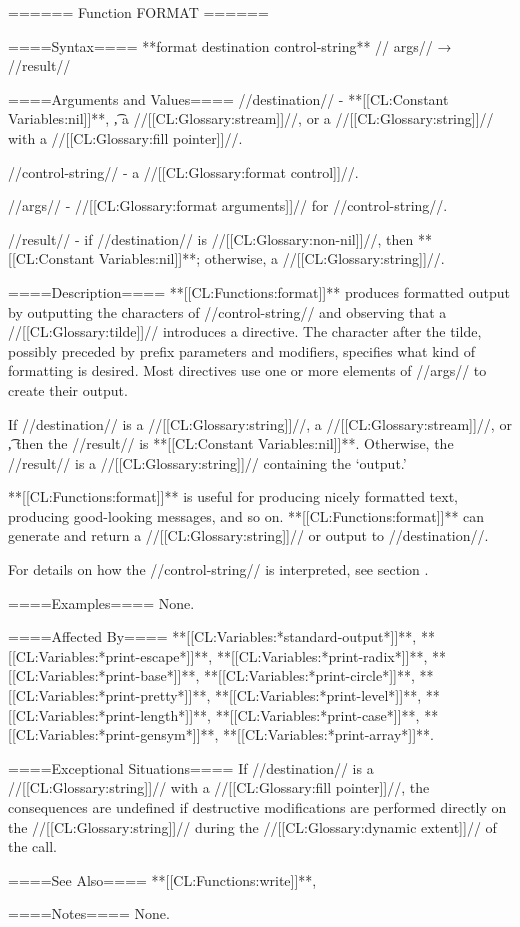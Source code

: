 ====== Function FORMAT ======

====Syntax====
**{format} {destination control-string** //\rest} args// → //result//

====Arguments and Values====
//destination// - **[[CL:Constant Variables:nil]]**, \t, a //[[CL:Glossary:stream]]//, or a //[[CL:Glossary:string]]// with a //[[CL:Glossary:fill pointer]]//.

//control-string// - a //[[CL:Glossary:format control]]//.

//args// - //[[CL:Glossary:format arguments]]// for //control-string//.

//result// - if //destination// is //[[CL:Glossary:non-nil]]//, then **[[CL:Constant Variables:nil]]**; otherwise, a //[[CL:Glossary:string]]//.

====Description====
**[[CL:Functions:format]]** produces formatted output by outputting the characters of //control-string// and observing that a //[[CL:Glossary:tilde]]// introduces a directive. The character after the tilde, possibly preceded by prefix parameters and modifiers, specifies what kind of formatting is desired. Most directives use one or more elements of //args// to create their output.

If //destination// is a //[[CL:Glossary:string]]//, a //[[CL:Glossary:stream]]//, or \t, then the //result// is **[[CL:Constant Variables:nil]]**. Otherwise, the //result// is a //[[CL:Glossary:string]]// containing the `output.'

**[[CL:Functions:format]]** is useful for producing nicely formatted text, producing good-looking messages, and so on. **[[CL:Functions:format]]** can generate and return a //[[CL:Glossary:string]]// or output to //destination//.

For details on how the //control-string// is interpreted, see section {\secref\FormattedOutput}.

====Examples====
None.

====Affected By====
**[[CL:Variables:*standard-output*]]**, **[[CL:Variables:*print-escape*]]**, **[[CL:Variables:*print-radix*]]**, **[[CL:Variables:*print-base*]]**, **[[CL:Variables:*print-circle*]]**, **[[CL:Variables:*print-pretty*]]**, **[[CL:Variables:*print-level*]]**, **[[CL:Variables:*print-length*]]**, **[[CL:Variables:*print-case*]]**, **[[CL:Variables:*print-gensym*]]**, **[[CL:Variables:*print-array*]]**.

====Exceptional Situations====
If //destination// is a //[[CL:Glossary:string]]// with a //[[CL:Glossary:fill pointer]]//, the consequences are undefined if destructive modifications are performed directly on the //[[CL:Glossary:string]]// during the //[[CL:Glossary:dynamic extent]]// of the call.

====See Also====
**[[CL:Functions:write]]**, {\secref\ImplementationDefinedScripts}

====Notes====
None.

 
